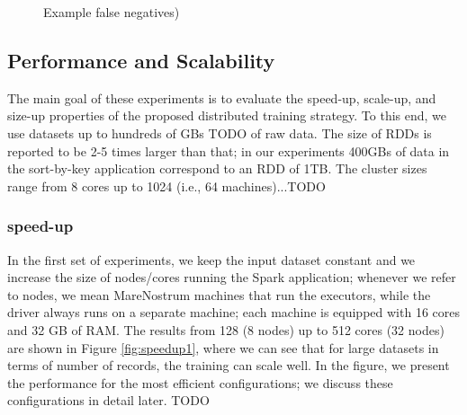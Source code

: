 \documentclass[smallextended]{svjour3}       %
\begin{document}
\begin{figure}
\caption{Example false negatives)}
\label{fig:spamexamples}
\end{figure}

\subsection{Performance and Scalability}
The main goal of these experiments is to evaluate the speed-up, scale-up, and size-up properties of the proposed distributed training strategy. To this end, we use datasets up to hundreds of GBs TODO of raw data. The size of RDDs is reported to be 2-5 times larger than that; in our experiments 400GBs of data in the sort-by-key application correspond to an RDD of 1TB.
 The cluster sizes range from 8 cores up to 1024 (i.e., 64 machines)...TODO

\subsubsection{speed-up} In the first set of experiments, we keep the input dataset constant and we increase the size of nodes/cores running the Spark application; whenever we refer to nodes, we mean  MareNostrum machines that run the executors, while the driver always runs on a separate machine; each machine is equipped with 16 cores and 32 GB of RAM. The results from 128 (8 nodes) up to 512 cores (32 nodes) are shown in Figure \ref{fig:speedup1}, where we can see that for large datasets in terms of number of records, the training can scale well. In the figure, we present the performance for the most efficient configurations; we discuss these configurations in detail later. TODO
\end{document}
